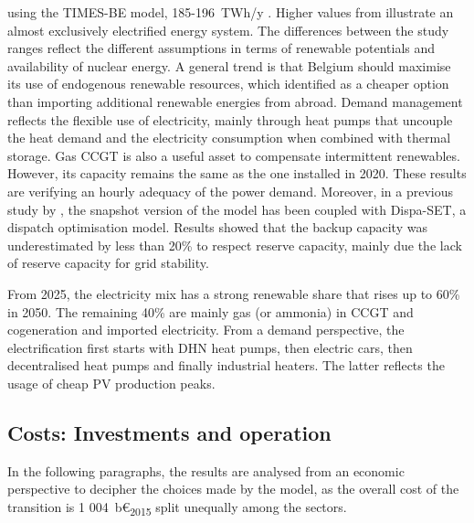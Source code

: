 using the TIMES-BE model, 185-196~TWh/y \cite{PATHS2050}. Higher values from \citet{Devogelaer2013} illustrate an almost exclusively electrified energy system. The differences between the study ranges reflect the different assumptions in terms of renewable potentials and availability of nuclear energy. A general trend is that Belgium should maximise its use of endogenous renewable resources, which \citet{dubois2023multi} identified as a cheaper option than importing additional renewable energies from abroad. Demand management reflects the flexible use of electricity, mainly through heat pumps that uncouple the heat demand and the electricity consumption when combined with thermal storage. Gas \gls{CCGT} is also a useful asset to compensate intermittent renewables. However, its capacity remains the same as the one installed in 2020. These results are verifying an hourly adequacy of the power demand. Moreover, in a previous study by \citet{pavivcevic2022bidirectionnal}, the snapshot version of the model has been coupled with Dispa-SET, a dispatch optimisation model. Results showed that the backup capacity was underestimated by less than 20\% to respect reserve capacity, mainly due the lack of reserve capacity for grid stability.  

From 2025, the electricity mix has a strong renewable share that rises up to 60\% in 2050. The remaining 40\% are mainly gas (or ammonia) in \gls{CCGT} and cogeneration and imported electricity. From a demand perspective, the electrification first starts with \gls{DHN} heat pumps, then electric cars, then decentralised heat pumps and finally industrial heaters. The latter reflects the usage of cheap \gls{PV} production peaks. 

\subsection{Costs: Investments and operation}

In the following paragraphs, the results are analysed from an economic perspective to decipher the choices made by the model, as the overall cost of the transition is 1 004~b€\textsubscript{2015} split unequally among the sectors. 

